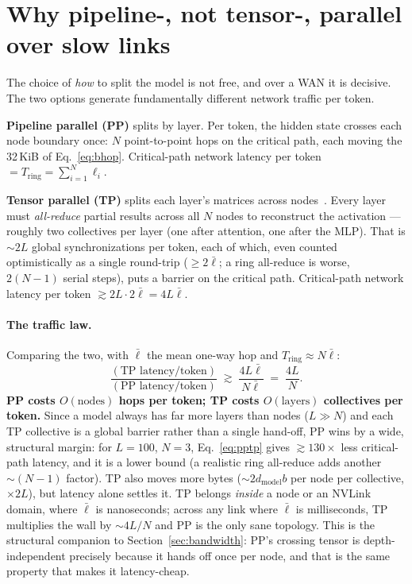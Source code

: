 \documentclass[11pt]{article}
\newcommand{\Tring}{\ensuremath{T_{\mathrm{ring}}}}
\newcommand{\dmodel}{\ensuremath{d_{\mathrm{model}}}}
\begin{document}
\section{Why pipeline-, not tensor-, parallel over slow links}
\label{sec:pptp}

The choice of \emph{how} to split the model is not free, and over a WAN it is decisive. The two
options generate fundamentally different network traffic per token.

\textbf{Pipeline parallel (PP)} splits by layer. Per token, the hidden state crosses each node
boundary once: $N$ point-to-point hops on the critical path, each moving the 32\,KiB of
Eq.~\eqref{eq:bhop}. Critical-path network latency per token $=\Tring=\sum_{i=1}^N\ell_i$.

\textbf{Tensor parallel (TP)} splits each layer's matrices across nodes~\cite{megatron}. Every layer
must \emph{all-reduce} partial results across all $N$ nodes to reconstruct the activation --- roughly
two collectives per layer (one after attention, one after the MLP). That is $\sim\!2L$ global
synchronizations per token, each of which, even counted optimistically as a single round-trip
($\ge\!2\bar\ell$; a ring all-reduce is worse, $2(N{-}1)$ serial steps), puts a barrier on the
critical path. Critical-path network latency per token $\gtrsim 2L\cdot2\bar\ell=4L\bar\ell$.

\paragraph{The traffic law.} Comparing the two, with $\bar\ell$ the mean one-way hop and
$\Tring\approx N\bar\ell$:
\begin{equation}
\frac{(\text{TP latency/token})}{(\text{PP latency/token})}
\;\gtrsim\;\frac{4L\bar\ell}{N\bar\ell}\;=\;\frac{4L}{N}.
\label{eq:pptp}
\end{equation}
\textbf{PP costs $O(\text{nodes})$ hops per token; TP costs $O(\text{layers})$ collectives per
token.} Since a model always has far more layers than nodes ($L\gg N$) and each TP collective is a
global barrier rather than a single hand-off, PP wins by a wide, structural margin: for $L=100$,
$N=3$, Eq.~\eqref{eq:pptp} gives $\gtrsim\!130\times$ less critical-path latency, and it is a lower
bound (a realistic ring all-reduce adds another $\sim(N{-}1)$ factor). TP also moves more bytes
($\sim\!2\dmodel b$ per node per collective, $\times 2L$), but latency alone settles it. TP belongs
\emph{inside} a node or an NVLink domain, where $\bar\ell$ is nanoseconds; across any link where
$\bar\ell$ is milliseconds, TP multiplies the wall by $\sim\!4L/N$ and PP is the only sane topology.
This is the structural companion to Section~\ref{sec:bandwidth}: PP's crossing tensor is
depth-independent precisely because it hands off once per node, and that is the same property that
makes it latency-cheap.
\end{document}
